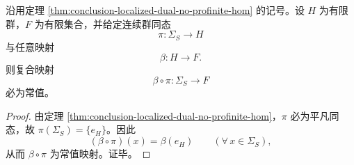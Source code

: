 \begin{corollary}[经有限群压缩的局部化对偶证书必为常值]\label{cor:conclusion-localized-dual-finite-group-certificate-constant}
沿用定理 \ref{thm:conclusion-localized-dual-no-profinite-hom} 的记号。设 \(H\) 为有限群，\(F\) 为有限集合，并给定连续群同态
\[
\pi:\Sigma_S\longrightarrow H
\]
与任意映射
\[
\beta:H\longrightarrow F.
\]
则复合映射
\[
\beta\circ\pi:\Sigma_S\longrightarrow F
\]
必为常值。
\end{corollary}
\begin{proof}
由定理 \ref{thm:conclusion-localized-dual-no-profinite-hom}，\(\pi\) 必为平凡同态，故 \(\pi(\Sigma_S)=\{e_H\}\)。因此
\[
(\beta\circ\pi)(x)=\beta(e_H)
\qquad(\forall\,x\in\Sigma_S),
\]
从而 \(\beta\circ\pi\) 为常值映射。证毕。
\end{proof}

